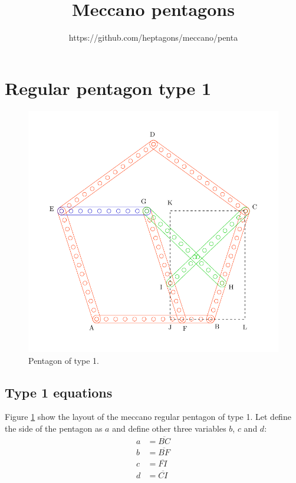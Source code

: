 \documentclass[11pt]{article}
\title{\textbf{Meccano pentagons}}
\author{https://github.com/heptagons/meccano/penta}
\date{}
\begin{document}
\maketitle

\section{Regular pentagon type 1}

\begin{figure}[htpb]
\centering
\includegraphics[scale=0.75]{penta-type-1}
\caption{Pentagon of type 1.}
\label{fig:type-1}
\end{figure}

\subsection{Type 1 equations}

Figure \ref{fig:type-1} show the layout of the meccano regular pentagon of type 1.
Let define the side of the pentagon as $a$ and define other three variables $b$, $c$ and $d$:
\begin{align*}
a &= \overline{BC}\\
b &= \overline{BF}\\
c &= \overline{FI}\\
d &= \overline{CI}
\end{align*}
\end{document}
